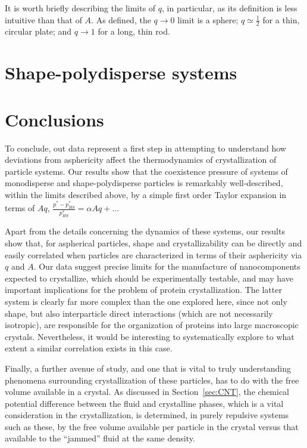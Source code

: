 It is worth briefly describing the limits of $q$, in particular, as its definition is less intuitive than that of $A$.
As defined, the $q \rightarrow 0$ limit is a sphere; $q \simeq \frac{1}{2}$ for a thin, circular plate; and $q \rightarrow 1$ for a long, thin rod.

\section{Shape-polydisperse systems}
\label{sec:polydisperse}



\section{Conclusions}

To conclude, out data represent a first step in attempting to understand how deviations from asphericity affect the thermodynamics of crystallization of particle systems.
Our results show  that the coexistence pressure of systems of monodisperse and shape-polydisperse particles is remarkably well-described, within the limits described above,   
 by a simple first order Taylor expansion in terms of $Aq$, $\frac{p^* - p^*_{HS}}{p^*_{HS}} = \alpha Aq + ...$

Apart from the details concerning the dynamics of these systems, our results show that, for aspherical particles,
shape and crystallizability can be directly and easily correlated when particles are characterized in terms of their
asphericity via $q$ and $A$. Our data suggest precise limits for the manufacture of nanocomponents expected to crystallize, which should be experimentally testable,
and may have important implications for the problem of protein crystallization. 
The latter system is clearly far more complex  than the one explored here,
since not only shape, but also interparticle direct interactions (which are not necessarily isotropic), 
are responsible for the organization of proteins into large macroscopic crystals. Nevertheless, it would be
interesting to systematically explore to what extent  a similar correlation exists in this case.   

Finally, a further avenue of study, and one that is vital to truly understanding phenomena surrounding crystallization of these particles, has to do with the free volume available in a crystal.
As discussed in Section~\ref{sec:CNT}, the chemical potential difference between the fluid and crystalline phases, which is a vital consideration in the crystallization, is determined, in purely repulsive systems such as these, by the free volume available per particle in the crystal versus that available to the ``jammed'' fluid at the same density.

